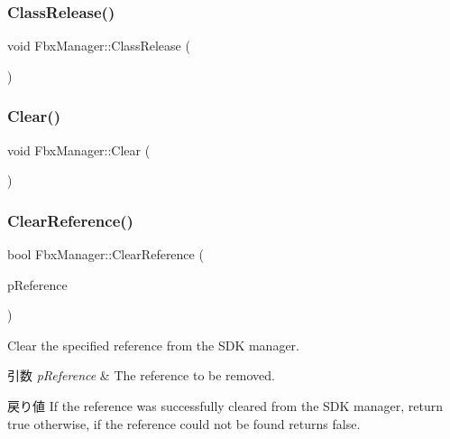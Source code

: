 \mbox{\label{class_fbx_manager_a950d348e320856f56dc0166267a4e09f}} 
\subsubsection{\texorpdfstring{Class\+Release()}{ClassRelease()}}
{\footnotesize\ttfamily void Fbx\+Manager\+::\+Class\+Release (\begin{DoxyParamCaption}{ }\end{DoxyParamCaption})\hspace{0.3cm}{\ttfamily [protected]}}

\mbox{\label{class_fbx_manager_a110cd4d52da8804bb9f0cda0319790b8}} 
\subsubsection{\texorpdfstring{Clear()}{Clear()}}
{\footnotesize\ttfamily void Fbx\+Manager\+::\+Clear (\begin{DoxyParamCaption}{ }\end{DoxyParamCaption})\hspace{0.3cm}{\ttfamily [protected]}}

\mbox{\label{class_fbx_manager_af3ae8fe5d18209a6101d4fab7565d273}} 
\subsubsection{\texorpdfstring{Clear\+Reference()}{ClearReference()}}
{\footnotesize\ttfamily bool Fbx\+Manager\+::\+Clear\+Reference (\begin{DoxyParamCaption}\item[{\hyperlink{class_fbx_scene_reference}{Fbx\+Scene\+Reference} $\ast$}]{p\+Reference }\end{DoxyParamCaption})}

Clear the specified reference from the S\+DK manager. 
\begin{DoxyParams}{引数}
{\em p\+Reference} & The reference to be removed. \\
\hline
\end{DoxyParams}
\begin{DoxyReturn}{戻り値}
If the reference was successfully cleared from the S\+DK manager, return {\ttfamily true} otherwise, if the reference could not be found returns {\ttfamily false}. 
\end{DoxyReturn}
\mbox{\label{class_fbx_manager_af51cafc0f34f17d497f7921d847a4dd4}} 
